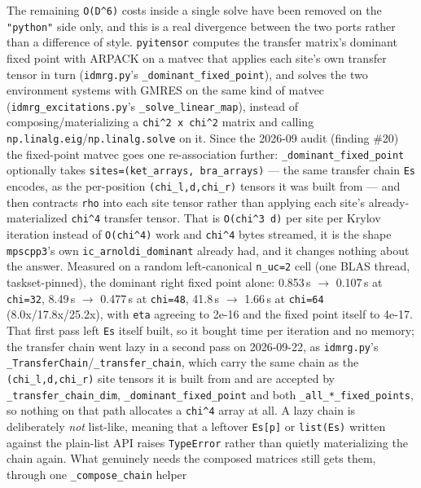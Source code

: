 \documentclass[11pt]{article}
\begin{document}
The remaining \texttt{O(D\^{}6)} costs inside a single solve have been
removed on the \texttt{"python"} side only, and this is a real divergence
between the two ports rather than a difference of style.
\texttt{pyitensor} computes the transfer matrix's dominant fixed point
with ARPACK on a matvec that applies each site's own transfer tensor in
turn (\texttt{idmrg.py}'s \texttt{\_dominant\_fixed\_point}), and solves
the two environment systems with GMRES on the same kind of matvec
(\texttt{idmrg\_excitations.py}'s \texttt{\_solve\_linear\_map}), instead
of composing/materializing a \texttt{chi\^{}2 x chi\^{}2} matrix and
calling \texttt{np.linalg.eig}/\texttt{np.linalg.solve} on it. Since the
2026-09 audit (finding \#20) the fixed-point matvec goes one
re-association further: \texttt{\_dominant\_fixed\_point} optionally
takes \texttt{sites=(ket\_arrays, bra\_arrays)} --- the same transfer
chain \texttt{Es} encodes, as the per-position
\texttt{(chi\_l,d,chi\_r)} tensors it was built from --- and then
contracts \texttt{rho} into each site tensor rather than applying each
site's already-materialized \texttt{chi\^{}4} transfer tensor. That is
\texttt{O(chi\^{}3 d)} per site per Krylov iteration instead of
\texttt{O(chi\^{}4)} work and \texttt{chi\^{}4} bytes streamed, it is the
shape \texttt{mpscpp3}'s own \texttt{ic\_arnoldi\_dominant} already had,
and it changes nothing about the answer. Measured on a random
left-canonical \texttt{n\_uc=2} cell (one BLAS thread, taskset-pinned),
the dominant right fixed point alone: 0.853\,s $\to$ 0.107\,s at
\texttt{chi=32}, 8.49\,s $\to$ 0.477\,s at \texttt{chi=48}, 41.8\,s
$\to$ 1.66\,s at \texttt{chi=64} (8.0x/17.8x/25.2x), with \texttt{eta}
agreeing to 2e-16 and the fixed point itself to 4e-17. That first pass
left \texttt{Es} itself built, so it bought time per iteration and no
memory; the transfer chain went lazy in a second pass on 2026-09-22, as
\texttt{idmrg.py}'s
\texttt{\_TransferChain}/\texttt{\_transfer\_chain}, which carry the
same chain as the \texttt{(chi\_l,d,chi\_r)} site tensors it is built
from and are accepted by \texttt{\_transfer\_chain\_dim},
\texttt{\_dominant\_fixed\_point} and both
\texttt{\_all\_*\_fixed\_points}, so nothing on that path allocates a
\texttt{chi\^{}4} array at all. A lazy chain is deliberately \emph{not}
list-like, meaning that a leftover \texttt{Es[p]} or \texttt{list(Es)}
written against the plain-list API raises \texttt{TypeError} rather than
quietly materializing the chain again. What genuinely needs the composed
matrices still gets them, through one \texttt{\_compose\_chain} helper
\end{document}
